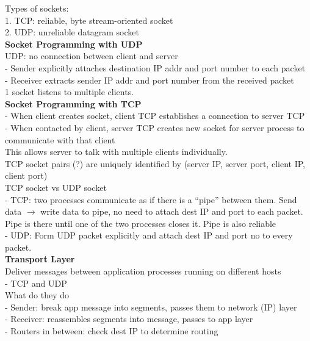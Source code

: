\documentclass[10pt, a4paper]{article}
\newcommand{\blue}[1]{{\color{MidnightBlue}#1}}
\newcommand{\red}[1]{{\color{red}#1}}
\begin{document}
\begin{multicols*}{3}
		Types of sockets:\\
		1. TCP: reliable, byte stream-oriented socket\\
		2. UDP: unreliable datagram socket\\

		\textbf{Socket Programming with \red{UDP}}\\
		\red{UDP: no connection between client and server}\\
		- Sender explicitly attaches destination IP addr and port number to \red{each packet}\\
		- Receiver extracts sender IP addr and port number from the received packet\\
		\red{1} socket listens to \red{multiple} clients.\\

		\textbf{Socket Programming with \red{TCP}}\\
		- When client creates socket, client TCP establishes a connection to server TCP\\
		- When contacted by client, server TCP \red{creates} new socket for server process to communicate with that client\\
		This allows server to talk with multiple clients individually.\\
		TCP socket pairs (?) are uniquely identified by \blue{(server IP, server port, client IP, client port)}\\

		TCP socket vs UDP socket\\
		- TCP: two processes communicate as if there is a ``pipe'' between them. Send data $\rightarrow$ write data to pipe, \blue{no need to attach} dest IP and port to each packet. Pipe is there until one of the two processes closes it. Pipe is also \blue{reliable}\\
		- UDP: Form UDP packet explicitly and \blue{attach} dest IP and port no to every packet.\\

		{\normalsize\textbf{Transport Layer}}\\
		Deliver messages between application processes running on different hosts\\
		- \blue{TCP} and \blue{UDP}\\

		What do they do\\
		- Sender: break app message into \blue{segments}, passes them to network (IP) layer\\
		- Receiver: reassembles segments into message, passes to app layer\\
		- Routers in between: check dest IP to determine routing\\


\end{multicols*}
\end{document}
